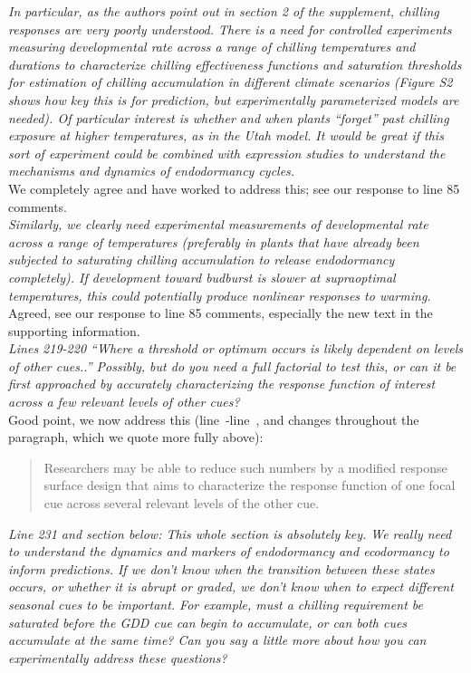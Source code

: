 \documentclass[11pt,letter]{article}
\newcommand{\lr}[1]{line~\lineref{#1}}
\begin{document}
\emph{In particular, as the authors point out in section 2 of the supplement, chilling responses are very poorly understood.  There is a need for controlled experiments measuring developmental rate across a range of chilling temperatures and durations to characterize chilling effectiveness functions and saturation thresholds for estimation of chilling accumulation in different climate scenarios (Figure S2 shows how key this is for prediction, but experimentally parameterized models are needed).   Of particular interest is whether and when plants ``forget'' past chilling exposure at higher temperatures, as in the Utah model.  It would be great if this sort of experiment could be combined with expression studies to understand the mechanisms and dynamics of endodormancy cycles.  }\\

We completely agree and have worked to address this; see our response to line 85 comments.\\

\emph{Similarly, we clearly need experimental measurements of developmental rate across a range of temperatures (preferably in plants that have already been subjected to saturating chilling accumulation to release endodormancy completely).  If development toward budburst is slower at supraoptimal temperatures, this could potentially produce nonlinear responses to warming. }\\

Agreed, see our response to line 85 comments, especially the new text in the supporting information.\\

\emph{Lines 219-220 “Where a threshold or optimum occurs is likely dependent on levels of other cues..”  Possibly, but do you need a full factorial to test this, or can it be first approached by accurately characterizing the response function of interest across a few relevant levels of other cues? }\\

Good point, we now address this (\lr{r2studydesignstart}-\lr{r2studydesignend}, and changes throughout the paragraph, which we quote more fully above):
\begin{quote}
Researchers may be able to reduce such numbers by a modified response surface design that aims to characterize the response function of one focal cue across several relevant levels of the other cue.
\end{quote}

\emph{Line 231 and section below: This whole section is absolutely key.  We really need to understand the dynamics and markers of endodormancy and ecodormancy to inform predictions.  If we don't know when the transition between these states occurs, or whether it is abrupt or graded, we don't know when to expect different seasonal cues to be important.  For example, must a chilling requirement be saturated before the GDD cue can begin to accumulate, or can both cues accumulate at the same time? Can you say a little more about how you can experimentally address these questions? }\\
\end{document}
